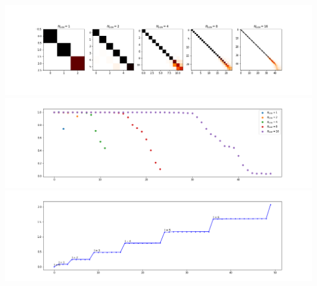 \begin{minipage}{.5\textwidth}
	\centering
	\includegraphics[width=0.9\linewidth]{../codes/02.HeatKernelGraphLaplacian/HEALPix/06_figures/optimal_thresholded.png}
	\includegraphics[width=0.9\linewidth]{../codes/02.HeatKernelGraphLaplacian/HEALPix/06_figures/optimal_thresholded_diagonal.png}
	\includegraphics[width=0.9\linewidth]{../codes/02.HeatKernelGraphLaplacian/HEALPix/06_figures/optimal_thresholded_eigenvalues.png}
\end{minipage}

